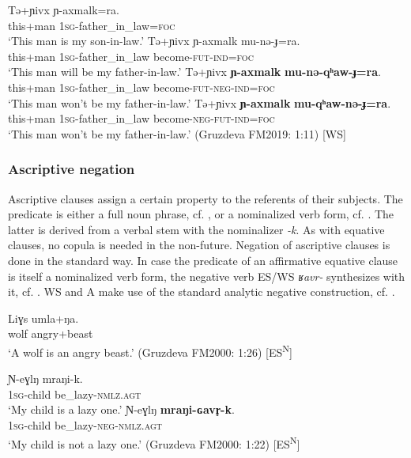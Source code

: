 \documentclass[output=paper,colorlinks,citecolor=brown]{langscibook}
\begin{document}
\ea\label{ex:niv:70}
    \ea\label{ex:niv:70a}
        \gll Tə+ɲivx ɲ-axmalk=ra. \\ 
             this+man \textsc{1sg}{}-father\_in\_law=\textsc{foc} \\
        \glt ‘This man is my son-in-law.’
    \ex\label{ex:niv:70b}
        \gll Tə+ɲivx ɲ-axmalk mu-nə-ɟ=ra. \\
             this+man \textsc{1sg}{}-father\_in\_law become-\textsc{fut-ind=foc} \\
        \glt ‘This man will be my father-in-law.’
    \ex\label{ex:niv:70c}
        \gll Tə+ɲivx \textbf{ɲ-axmalk} \textbf{mu-nə-qʰaw-ɟ=ra}. \\ 
             this+man \textsc{1sg}{}-father\_in\_law become-\textsc{fut-neg-ind=foc} \\
        \glt ‘This man won’t be my father-in-law.’
    \ex\label{ex:niv:70d}
        \gll Tə+ɲivx \textbf{ɲ-axmalk} \textbf{mu-qʰaw-nə-ɟ=ra}. \\
             this+man \textsc{1sg}{}-father\_in\_law become-\textsc{neg-fut-ind=foc}\\
        \glt ‘This man won’t be my father-in-law.’ (Gruzdeva FM2019: 1:11) [WS]
    \z
\z 

\subsubsection{Ascriptive negation}\label{sec:niv:2.3.5} 

Ascriptive clauses assign a certain property to the referents of their subjects. The predicate is either a full noun phrase, cf. , or a nominalized verb form, cf. . The latter is derived from a verbal stem with the nominalizer \textit{-k}. As with equative clauses, no copula is needed in the non-future. Negation of ascriptive clauses is done in the standard way. In case the predicate of an affirmative equative clause is itself a nominalized verb form, the negative verb ES/WS \textit{ʁavr{}-} synthesizes with it, cf. . WS and A make use of the standard analytic negative construction, cf. .

\ea\label{ex:niv:71}
    \gll Liɣs umla+ŋa. \\ 
         wolf angry+beast \\
    \glt ‘A wolf is an angry beast.’ (Gruzdeva FM2000: 1:26) [ES\textsuperscript{N}]
\z 

\ea\label{ex:niv:72}
    \ea\label{ex:niv:72a}
        \gll Ɲ-eɣlŋ mraŋi-k. \\ 
             \textsc{1sg}{}-child be\_lazy-\textsc{nmlz.agt} \\
        \glt ‘My child is a lazy one.’
    \ex\label{ex:niv:72b}
        \gll Ɲ-eɣlŋ \textbf{mraŋi-ɢavr̥-k}. \\
            \textsc{1sg-}child be\_lazy-\textsc{neg-nmlz.agt} \\
        \glt  ‘My child is not a lazy one.’ (Gruzdeva FM2000: 1:22) [ES\textsuperscript{N}]
    \z
\z
\end{document}
